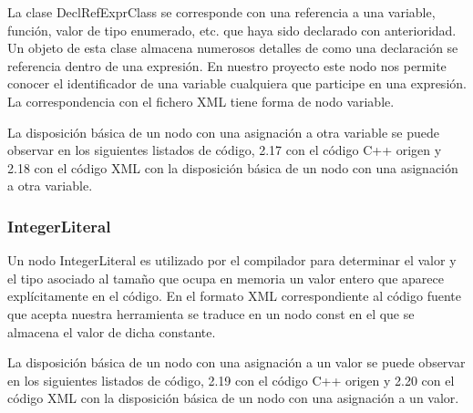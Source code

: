 La clase DeclRefExprClass se corresponde con una referencia a una variable, funci\'on, valor de tipo enumerado, etc. que haya sido declarado con anterioridad. Un objeto de esta clase almacena numerosos detalles de como una declaraci\'on se referencia dentro de una expresi\'on. En nuestro proyecto este nodo nos permite conocer el identificador de una variable cualquiera que participe en una expresi\'on. La correspondencia con el fichero XML tiene forma de nodo variable.

La disposici\'on b\'asica de un nodo con una asignaci\'on a otra variable se puede observar en los siguientes listados de c\'odigo, 2.17 con el c\'odigo C++ origen y 2.18 con el c\'odigo XML con la disposici\'on b\'asica de un nodo con una asignaci\'on a otra variable.




\subsubsection*{IntegerLiteral}

Un nodo IntegerLiteral es utilizado por el compilador para determinar el valor y el tipo asociado al tama\~no que ocupa en memoria un valor entero que aparece expl\'icitamente en el c\'odigo. En el formato XML correspondiente al c\'odigo fuente que acepta nuestra herramienta se traduce en un nodo const en el que se almacena el valor de dicha constante.

La disposici\'on b\'asica de un nodo con una asignaci\'on a un valor se puede observar en los siguientes listados de c\'odigo, 2.19 con el c\'odigo C++ origen y 2.20 con el c\'odigo XML con la disposici\'on b\'asica de un nodo con una asignaci\'on a un valor.




